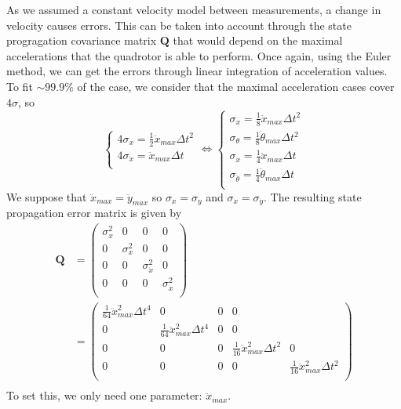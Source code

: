 \documentclass[12pt]{article}
\begin{document}
As we assumed a constant velocity model between measurements, a change in velocity causes errors.
This can be taken into account through the state progragation covariance matrix $\mathbf{Q}$ that would depend on the maximal accelerations that the quadrotor is able to perform.
Once again, using the Euler method, we can get the errors through linear integration of acceleration values.
To fit $\sim 99.9\%$ of the case, we consider that the maximal acceleration cases cover $4\sigma$, so
\begin{equation}
\left\{
    \begin{array}{l}
    4 \sigma_x = \frac{1}{2} \ddot{x}_{max} \Delta{t}^2 \\
    4 \sigma_{\dot{x}} = \ddot{x}_{max} \Delta{t} \\
    \end{array}
\right.
\Leftrightarrow
\left\{
    \begin{array}{l}
    \sigma_x = \frac{1}{8} \ddot{x}_{max} \Delta{t}^2 \\
    \sigma_{\theta} = \frac{1}{8} \ddot{\theta}_{max} \Delta{t}^2 \\
    \sigma_{\dot{x}} = \frac{1}{4} \ddot{x}_{max} \Delta{t} \\
    \sigma_{\dot{\theta}} = \frac{1}{4} \ddot{\theta}_{max} \Delta{t} \\
    \end{array}
\right.
\end{equation}
We suppose that $\ddot{x}_{max} = \ddot{y}_{max}$ so $\sigma_x = \sigma_y$ and $\sigma_{\dot{x}} = \sigma_{\dot{y}}$.
The resulting state propagation error matrix is given by
\begin{equation}
\begin{split}
\mathbf{Q}
    & =
    \begin{pmatrix}
        \sigma_x^2 & 0 & 0 & 0 \\
        0 & \sigma_x^2 & 0 & 0 \\
        0 & 0 & \sigma_{\dot{x}}^2 & 0 \\
        0 & 0 & 0 & \sigma_{\dot{x}}^2 \\
    \end{pmatrix}
    \\
    & =
    \begin{pmatrix}
        \frac{1}{64} \ddot{x}_{max}^2 \Delta{t}^4 & 0 & 0 & 0 \\
        0 & \frac{1}{64} \ddot{x}_{max}^2 \Delta{t}^4 & 0 & 0 \\
        0 & 0 & 0 & \frac{1}{16} \ddot{x}_{max}^2 \Delta{t}^2 & 0 \\
        0 & 0 & 0 & 0 & \frac{1}{16} \ddot{x}_{max}^2 \Delta{t}^2 \\
    \end{pmatrix}
    \\
\end{split}
\end{equation}
To set this, we only need one parameter: $\ddot{x}_{max}$.
\end{document}
